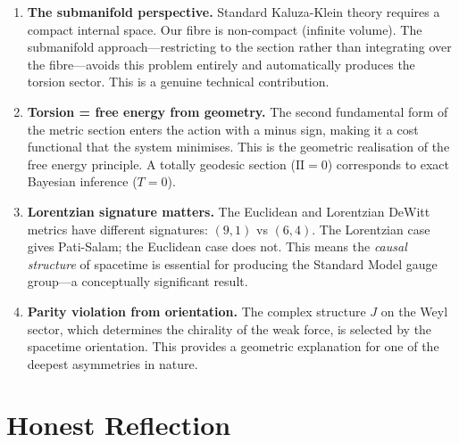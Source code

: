 \documentclass[12pt,a4paper]{article}
\begin{document}
\begin{enumerate}
\item \textbf{The submanifold perspective.} Standard Kaluza-Klein theory requires a compact internal space. Our fibre is non-compact (infinite volume). The submanifold approach---restricting to the section rather than integrating over the fibre---avoids this problem entirely and automatically produces the torsion sector. This is a genuine technical contribution.

\item \textbf{Torsion = free energy from geometry.} The second fundamental form of the metric section enters the action with a minus sign, making it a cost functional that the system minimises. This is the geometric realisation of the free energy principle. A totally geodesic section ($\mathrm{II} = 0$) corresponds to exact Bayesian inference ($T = 0$).

\item \textbf{Lorentzian signature matters.} The Euclidean and Lorentzian DeWitt metrics have different signatures: $(9,1)$ vs $(6,4)$. The Lorentzian case gives Pati-Salam; the Euclidean case does not. This means the \textit{causal structure} of spacetime is essential for producing the Standard Model gauge group---a conceptually significant result.

\item \textbf{Parity violation from orientation.} The complex structure $J$ on the Weyl sector, which determines the chirality of the weak force, is selected by the spacetime orientation. This provides a geometric explanation for one of the deepest asymmetries in nature.
\end{enumerate}

\section{Honest Reflection}
\end{document}
